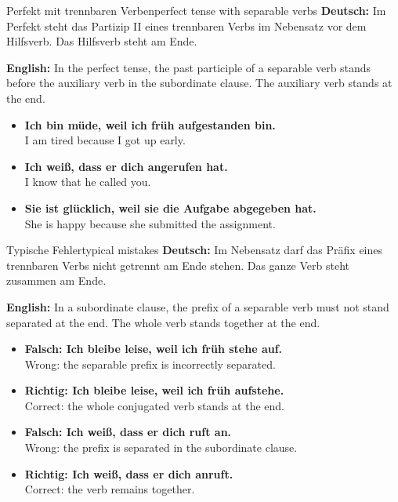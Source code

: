 \documentclass[a4paper,11pt]{article}
\newcommand{\GermanText}[1]{\textbf{Deutsch: }#1\par}
\newcommand{\EnglishText}[1]{{\small\color{SoftGray}\textbf{English: }#1\par}}
\newcommand{\ExampleItem}[2]{\item \textbf{#1}\\{\small\color{SoftGray}#2}}
\begin{document}
        \begin{grammarentry}{Perfekt mit trennbaren Verben}{perfect tense with separable verbs}
            \GermanText{Im Perfekt steht das Partizip II eines trennbaren Verbs im Nebensatz vor dem Hilfsverb. Das Hilfsverb steht am Ende.}
            \EnglishText{In the perfect tense, the past participle of a separable verb stands before the auxiliary verb in the subordinate clause. The auxiliary verb stands at the end.}
            
            \begin{exbox}
                \begin{itemize}
                    \ExampleItem{Ich bin müde, weil ich früh aufgestanden bin.}{I am tired because I got up early.}
                    \ExampleItem{Ich weiß, dass er dich angerufen hat.}{I know that he called you.}
                    \ExampleItem{Sie ist glücklich, weil sie die Aufgabe abgegeben hat.}{She is happy because she submitted the assignment.}
                \end{itemize}
            \end{exbox}
        \end{grammarentry}
        
        \begin{grammarentry}{Typische Fehler}{typical mistakes}
            \GermanText{Im Nebensatz darf das Präfix eines trennbaren Verbs nicht getrennt am Ende stehen. Das ganze Verb steht zusammen am Ende.}
            \EnglishText{In a subordinate clause, the prefix of a separable verb must not stand separated at the end. The whole verb stands together at the end.}
            
            \begin{exbox}
                \begin{itemize}
                    \ExampleItem{Falsch: Ich bleibe leise, weil ich früh stehe auf.}{Wrong: the separable prefix is incorrectly separated.}
                    \ExampleItem{Richtig: Ich bleibe leise, weil ich früh aufstehe.}{Correct: the whole conjugated verb stands at the end.}
                    \ExampleItem{Falsch: Ich weiß, dass er dich ruft an.}{Wrong: the prefix is separated in the subordinate clause.}
                    \ExampleItem{Richtig: Ich weiß, dass er dich anruft.}{Correct: the verb remains together.}
                \end{itemize}
            \end{exbox}
        \end{grammarentry}
\end{document}
